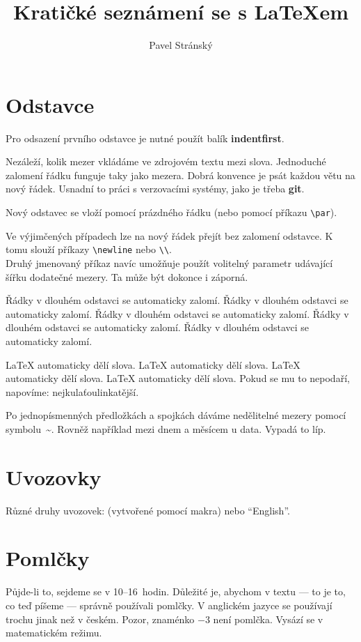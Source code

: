 \documentclass{article}
\author{Pavel Stránský}
\title{Kratičké seznámení se s \LaTeX em}
\def\uv#1{\clqq{#1}\crqq}		%
\begin{document}
	\maketitle					%
	
	\section{Odstavce}
	\label{sec:odstavce}
		Pro odsazení prvního odstavce je nutné použít balík \textbf{indentfirst}.

		Nezáleží,      kolik
		mezer      vkládáme       ve zdrojovém
		textu
		mezi     slova.
		Jednoduché      zalomení   řádku 
		funguje taky      jako
		mezera.
		Dobrá konvence je psát každou větu na nový řádek.
		Usnadní to práci s verzovacími systémy, jako je třeba \textbf{git}.

		Nový odstavec se vloží pomocí prázdného řádku (nebo pomocí příkazu \verb+\par+).
		
		Ve výjimčených případech lze na nový řádek přejít bez zalomení odstavce.
		K tomu slouží příkazy \verb+\newline+ nebo \verb+\\+.
		\\[2px]
		Druhý jmenovaný příkaz navíc umožňuje použít volitelný parametr udávající šířku dodatečné mezery. 
		Ta může být dokonce i záporná.

		Řádky v dlouhém odstavci se automaticky zalomí. 
		Řádky v dlouhém odstavci se automaticky zalomí. 
		Řádky v dlouhém odstavci se automaticky zalomí. 
		Řádky v dlouhém odstavci se automaticky zalomí. 
		Řádky v dlouhém odstavci se automaticky zalomí. 
		
		\LaTeX{} automaticky dělí slova.
		\LaTeX{} automaticky dělí slova.
		\LaTeX{} automaticky dělí slova.
		\LaTeX{} automaticky dělí slova.
		Pokud se mu to nepodaří, napovíme: nej\-ku\-la\-ťou\-lin\-ka\-těj\-ší.
		
		Po jednopísmenných předložkách a spojkách dáváme nedělitelné mezery pomocí symbolu~\~{}.
		Rovněž například mezi dnem a měsícem u data.
		Vypadá to líp.

	\section{Uvozovky}
		Různé druhy uvozovek: \uv{české} (vytvořené pomocí makra) nebo ``English''.

	\section{Pomlčky}
		Půjde-li to, sejdeme se v 10--16~hodin.
		Důležité je, abychom v textu --- to je to, co teď píšeme --- správně používali pomlčky.
		V anglickém jazyce se používají trochu jinak než v českém.
		Pozor, znaménko $-3$ není pomlčka. 
		Vysází se v matematickém režimu.
\end{document}
